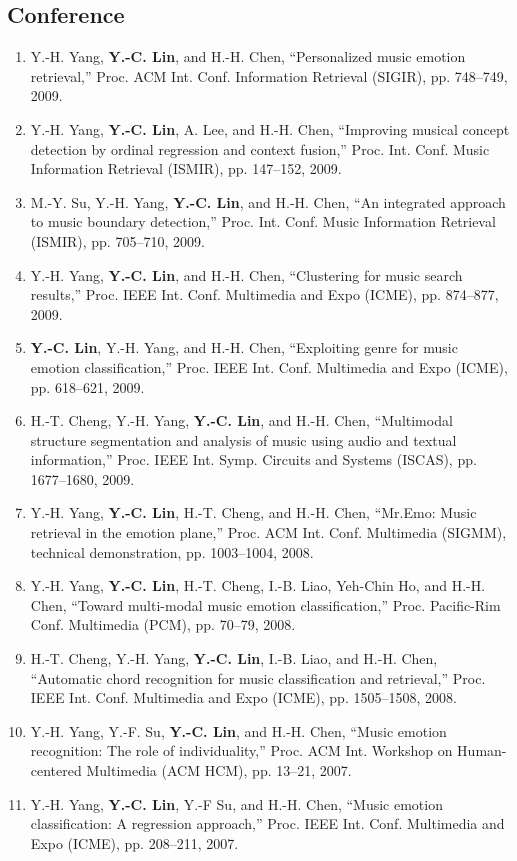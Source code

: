 \documentclass{res}
\begin{document}
\begin{CJK}{UTF8}{bsmi}
\begin{resume}
	\subsection{Conference}
		\begin{enumerate}[1.~]
			\item Y.-H. Yang, \textbf{Y.-C. Lin}, and H.-H. Chen, 
				``Personalized music emotion retrieval,'' 
				Proc. ACM Int. Conf. Information Retrieval (SIGIR), 
				pp. 748–749, 2009.
			\item Y.-H. Yang, \textbf{Y.-C. Lin}, A. Lee, and H.-H. Chen, 
				``Improving musical concept detection by ordinal regression and context fusion,'' 
				Proc. Int. Conf. Music Information Retrieval (ISMIR), 
				pp. 147–152, 2009.
			\item M.-Y. Su, Y.-H. Yang, \textbf{Y.-C. Lin}, and H.-H. Chen, 
				``An integrated approach to music boundary detection,'' 
				Proc. Int. Conf. Music Information Retrieval (ISMIR), 
				pp. 705–710, 2009.
			\item Y.-H. Yang, \textbf{Y.-C. Lin}, and H.-H. Chen, 
				``Clustering for music search results,''
				Proc. IEEE Int. Conf. Multimedia and Expo (ICME), 
				pp. 874–877, 2009.
			\item \textbf{Y.-C. Lin}, Y.-H. Yang, and H.-H. Chen, 
				``Exploiting genre for music emotion classification,''
				Proc. IEEE Int. Conf. Multimedia and Expo (ICME), 
				pp. 618–621, 2009.
			\item H.-T. Cheng, Y.-H. Yang, \textbf{Y.-C. Lin}, and H.-H. Chen, 
				``Multimodal structure segmentation and analysis of music using audio and textual information,'' 
				Proc. IEEE Int. Symp. Circuits and Systems (ISCAS), 
				pp. 1677–1680, 2009.
			\item Y.-H. Yang, \textbf{Y.-C. Lin}, H.-T. Cheng, and H.-H. Chen, 
				``Mr.Emo: Music retrieval in the emotion plane,'' 
				Proc. ACM Int. Conf. Multimedia (SIGMM), technical demonstration, 
				pp. 1003–1004, 2008.
			\item Y.-H. Yang, \textbf{Y.-C. Lin}, H.-T. Cheng, I.-B. Liao, Yeh-Chin Ho, and H.-H. Chen, 
				``Toward multi-modal music emotion classification,''
				Proc. Pacific-Rim Conf. Multimedia (PCM), 
				pp. 70–79, 2008.
			\item H.-T. Cheng, Y.-H. Yang, \textbf{Y.-C. Lin}, I.-B. Liao, and H.-H. Chen, 
				``Automatic chord recognition for music classification and retrieval,'' 
				Proc. IEEE Int. Conf. Multimedia and Expo (ICME), 
				pp. 1505–1508, 2008.
			\item Y.-H. Yang, Y.-F. Su, \textbf{Y.-C. Lin}, and H.-H. Chen, 
				``Music emotion recognition: The role of individuality,''
				Proc. ACM Int. Workshop on Human-centered Multimedia (ACM HCM), 
				pp. 13–21, 2007.
			\item Y.-H. Yang, \textbf{Y.-C. Lin}, Y.-F Su, and H.-H. Chen, 
				``Music emotion classification: A regression approach,''
				Proc. IEEE Int. Conf. Multimedia and Expo (ICME), 
				pp. 208–211, 2007.
		\end{enumerate}

\end{resume}
\end{CJK}
\end{document}
